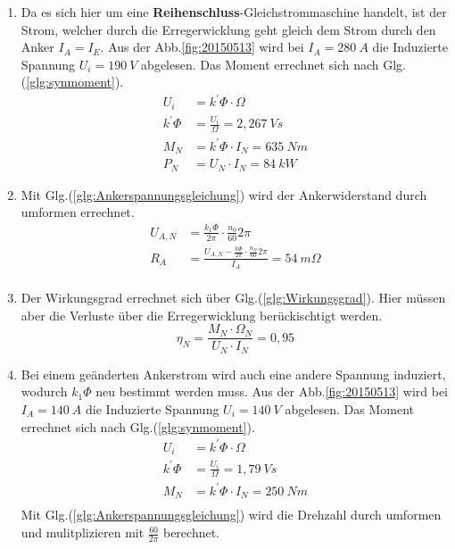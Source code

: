 \begin{solution}
\begin{enumerate}
\item Da es sich hier um eine \textbf{Reihenschluss}-Gleichstrommaschine handelt, ist der Strom, welcher durch die Erregerwicklung geht gleich dem Strom durch den Anker $I_A=I_E$. Aus der Abb.\ref{fig:20150513} wird bei $I_A= 280~A$ die Induzierte Spannung $U_i= 190~V$ abgelesen. Das Moment errechnet sich nach Glg.(\ref{glg:synmoment}).
\begin{align}
U_i &= k^{'} \Phi \cdot \Omega\\
k^{'} \Phi &= \frac{U_i}{\Omega} = 2,267~Vs\\
M_N &= k^{'} \Phi \cdot I_N = 635~Nm\\
P_N &= U_N \cdot I_N =  84~kW
\end{align}
\item Mit Glg.(\ref{glg:Ankerspannungsgleichung}) wird der Ankerwiderstand durch umformen errechnet.\\
\begin{align}
U_{A,N} &= \frac{k_1 \Phi}{2 \pi} \cdot \frac{n_0}{60} 2 \pi\\
R_A &= \frac{U_{A,N} - \frac{k \Phi}{2 \pi} \cdot \frac{n_N}{60} 2 \pi}{I_A}=54~m \Omega\\
\end{align}
\item Der Wirkungsgrad errechnet sich über Glg.(\ref{glg:Wirkungsgrad}). Hier müssen aber die Verluste über die Erregerwicklung berückischtigt werden.
\begin{equation}
\eta_N = \frac{M_N \cdot \Omega_N}{U_N \cdot I_N} =0,95
\end{equation}
\item Bei einem ge\"anderten Ankerstrom wird auch eine andere Spannung induziert, wodurch $k_1 \Phi$ neu bestimmt werden muss. Aus der Abb.\ref{fig:20150513} wird bei $I_A= 140~A$ die Induzierte Spannung $U_i= 140~V$ abgelesen. Das Moment errechnet sich nach Glg.(\ref{glg:synmoment}).
\begin{align}
U_i &= k^{'} \Phi \cdot \Omega\\
k^{'} \Phi &= \frac{U_i}{\Omega} = 1,79~Vs\\
M_N &= k^{'} \Phi \cdot I_N = 250~Nm\\
\end{align}
Mit Glg.(\ref{glg:Ankerspannungsgleichung}) wird die Drehzahl durch umformen und mulitplizieren mit $\frac{60}{2 \pi}$ berechnet.
\begin{align}

\end{align}
\end{enumerate}
\end{solution}
